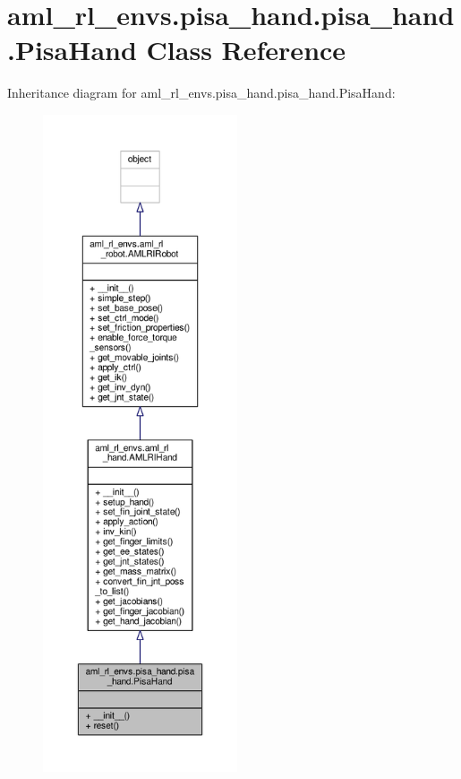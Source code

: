 \hypertarget{classaml__rl__envs_1_1pisa__hand_1_1pisa__hand_1_1_pisa_hand}{\section{aml\-\_\-rl\-\_\-envs.\-pisa\-\_\-hand.\-pisa\-\_\-hand.\-Pisa\-Hand Class Reference}
\label{classaml__rl__envs_1_1pisa__hand_1_1pisa__hand_1_1_pisa_hand}
}


Inheritance diagram for aml\-\_\-rl\-\_\-envs.\-pisa\-\_\-hand.\-pisa\-\_\-hand.\-Pisa\-Hand\-:
\nopagebreak
\begin{figure}[H]
\begin{center}
\leavevmode
\includegraphics[height=550pt]{classaml__rl__envs_1_1pisa__hand_1_1pisa__hand_1_1_pisa_hand__inherit__graph}
\end{center}
\end{figure}


